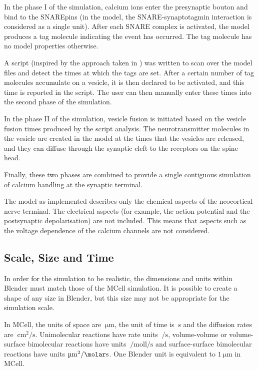 \documentclass[a4paper]{article}
\begin{document}
In the phase I of the simulation, calcium ions enter the presynaptic bouton and bind to the SNAREpins (in the model, the SNARE-synaptotagmin interaction is considered as a single unit). After each SNARE complex is activated, the model produces a tag molecule indicating the event has occurred. The tag molecule has no model properties otherwise.

A script (inspired by the approach taken in \cite{ma2014quantitative}) was written to scan over the model files and detect the times at which the tags are set. After a certain number of tag molecules accumulate on a vesicle, it is then declared to be activated, and this time is reported in the script. The user can then manually enter these times into the second phase of the simulation.

In the phase II of the simulation, vesicle fusion is initiated based on the vesicle fusion times produced by the script analysis. The neurotransmitter molecules in the vesicle are created in the model at the times that the vesicles are released, and they can diffuse through the synaptic cleft to the receptors on the spine head.

Finally, these two phases are combined to provide a single contiguous simulation of calcium handling at the synaptic terminal.

The model as implemented describes only the chemical aspects of the neocortical nerve terminal. The electrical aspects (for example, the action potential and the postsynaptic depolarisation) are not included. This means that aspects such as the voltage dependence of the calcium channels are not considered.

\subsection{Scale, Size and Time}
In order for the simulation to be realistic, the dimensions and units within Blender must match those of the MCell simulation. It is possible to create a shape of any size in Blender, but this size may not be appropriate for the simulation scale.

In MCell, the units of space are $\SI{}{\micro\metre}$, the unit of time is $\SI{}{\second}$ and the diffusion rates are $\SI{}{\centi\metre\squared\per\second}$. Unimolecular reactions have rate units $\SI{}{\per\second}$, volume-volume or volume-surface bimolecular reactions have units $\SI{}{\per\mole\litre\per\second}$ and surface-surface bimolecular reactions have units $\SI{}{\micro\metre\squared\per\molar\second}$. One Blender unit is equivalent to $\SI{1}{\micro\metre}$ in MCell. 
\end{document}
